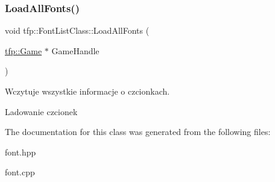 \subsubsection{\texorpdfstring{Load\+All\+Fonts()}{LoadAllFonts()}}
{\footnotesize\ttfamily void tfp\+::\+Font\+List\+Class\+::\+Load\+All\+Fonts (\begin{DoxyParamCaption}\item[{\mbox{\hyperlink{classtfp_1_1_game}{tfp\+::\+Game}} $\ast$}]{Game\+Handle }\end{DoxyParamCaption})}



Wczytuje wszystkie informacje o czcionkach. 

Ladowanie czcionek 

The documentation for this class was generated from the following files\+:\begin{DoxyCompactItemize}
\item 
font.\+hpp\item 
font.\+cpp\end{DoxyCompactItemize}
